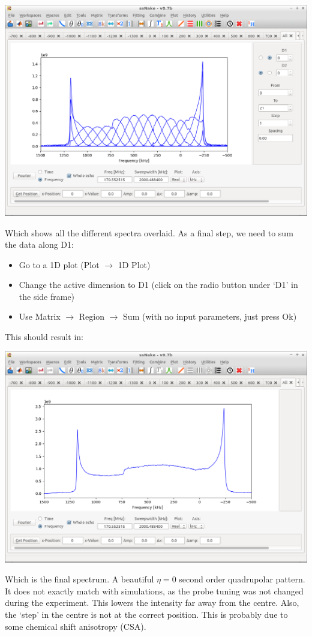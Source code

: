 \documentclass[11pt,a4paper]{article}
\begin{document}
\begin{center}
\includegraphics[width=0.8\linewidth]{Figs/Fig3.png}
\end{center}

Which shows all the different spectra overlaid.
As a final step, we need to sum the data along D1:
\begin{itemize}
\item Go to a 1D plot (Plot $\longrightarrow$ 1D Plot)
\item Change the active dimension to D1 (click on the radio button under `D1' in the side frame)
\item Use Matrix $\longrightarrow$ Region $\longrightarrow$ Sum (with no input parameters, just press Ok)
\end{itemize}
This should result in:
\begin{center}
\includegraphics[width=0.8\linewidth]{Figs/Fig4.png}
\end{center}
Which is the final spectrum.
A beautiful $\eta = 0$ second order quadrupolar pattern.
It does not exactly match with simulations, as the probe tuning was not changed during the experiment.
This lowers the intensity far away from the centre.
Also, the `step' in the centre is not at the correct position.
This is probably due to some chemical shift anisotropy (CSA).
\end{document}
